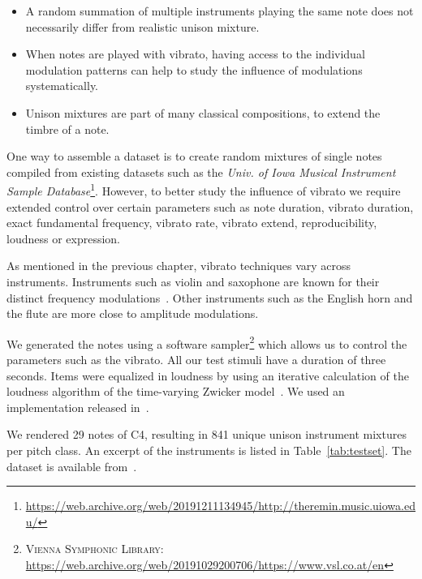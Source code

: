 \begin{itemize}
  \item A random summation of multiple instruments playing the same note does not necessarily differ from realistic unison mixture.
  \item When notes are played with vibrato, having access to the individual modulation patterns can help to study the influence of modulations systematically.
  \item Unison mixtures are part of many classical compositions, to extend the timbre of a note.
\end{itemize}

\par
One way to assemble a dataset is to create random mixtures of single notes compiled from existing datasets such as the \emph{Univ. of Iowa Musical Instrument Sample Database}\footnote{\url{https://web.archive.org/web/20191211134945/http://theremin.music.uiowa.edu/}}.
However, to better study the influence of vibrato we require extended control over certain parameters such as note duration, vibrato duration, exact fundamental frequency, vibrato rate, vibrato extend, reproducibility, loudness or expression.
\par
As mentioned in the previous chapter, vibrato techniques vary across instruments. 
Instruments such as violin and saxophone are known for their distinct frequency modulations~\cite{gilbert05}.
Other instruments such as the English horn and the flute are more close to amplitude modulations.
\par
We generated the notes using a software sampler\footnote{\textsc{Vienna Symphonic Library}: \url{https://web.archive.org/web/20191029200706/https://www.vsl.co.at/en}} which allows us to control the parameters such as the vibrato.
All our test stimuli have a duration of three seconds.
Items were equalized in loudness by using an iterative calculation of the loudness algorithm of the time-varying Zwicker model~\cite{zwicker13}. 
We used an implementation released in~\cite{genesis12}. 
\par
We rendered 29 notes of C4, resulting in 841 unique unison instrument mixtures per pitch class.
An excerpt of the instruments is listed in Table~\ref{tab:testset}.
The dataset is available from~\cite{oss_unison}.

